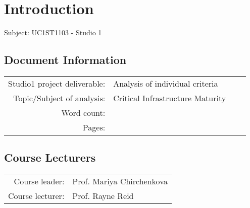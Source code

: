 \section{Introduction}

{\huge{Subject: UC1ST1103 - Studio 1}}

\subsection{Document Information}

\begin{tabular}{r|l p{20mm} p{40mm}}
    Studio1 project deliverable: & Analysis of individual criteria \\
    Topic/Subject of analysis: & Critical Infrastructure Maturity\\
    Word count: & {\color{red}{N/A}}\\
    Pages: & \pageref{LastPage} \\

\end{tabular}

\subsection{Course Lecturers}

\begin{tabular}{r @{} l}
    Course leader: & Prof. Mariya Chirchenkova\\
    Course lecturer: & Prof. Rayne Reid\\
\end{tabular}
